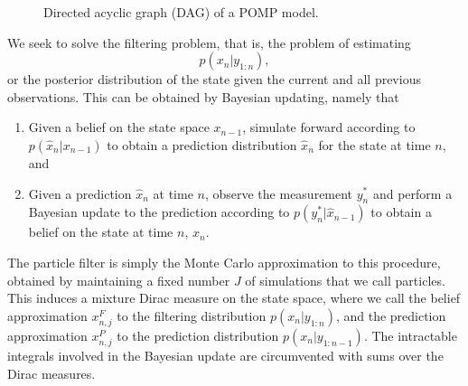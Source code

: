 \documentclass{article}
\begin{document}
\begin{figure}[H]
\centering
{}
\caption{Directed acyclic graph (DAG) of a POMP model.}
\end{figure}

We seek to solve the filtering problem, that is, the problem of estimating
$$p(x_n|y_{1:n}),$$
or the posterior distribution of the state given the current and all previous observations. This can be obtained by Bayesian updating, namely that
\begin{enumerate}
    \item Given a belief on the state space $x_{n-1}$, simulate forward according to $p(\hat x_{n}|x_{n-1})$ to obtain a prediction distribution $\hat x_n$ for the state at time $n$, and
    \item Given a prediction $\hat{x}_n$ at time $n$, observe the measurement $y_n^*$ and perform a Bayesian update to the prediction according to $p(y_n^* | \hat x_{n-1})$ to obtain a belief on the state at time $n$, $x_n$. 
\end{enumerate}

The particle filter is simply the Monte Carlo approximation to this procedure, obtained by maintaining a fixed number $J$ of simulations that we call particles. This induces a mixture Dirac measure on the state space, where we call the belief approximation $x_{n,j}^F$ to the filtering distribution $p(x_n|y_{1:n})$, and the prediction approximation $x_{n,j}^P$ to the prediction distribution $p(x_{n}|y_{1:n-1})$. The intractable integrals involved in the Bayesian update are circumvented with sums over the Dirac measures. 
\end{document}
